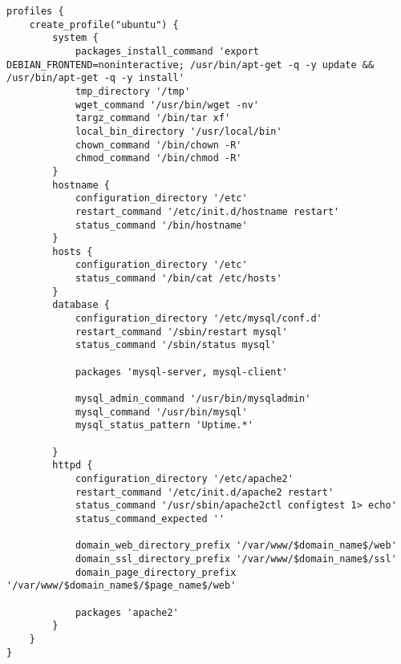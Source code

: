 \begin{lstlisting}[style=Java, caption=Beispiel Profil Ubuntu Server]
profiles {
	create_profile("ubuntu") {
		system {
			packages_install_command 'export DEBIAN_FRONTEND=noninteractive; /usr/bin/apt-get -q -y update && /usr/bin/apt-get -q -y install'
			tmp_directory '/tmp'
			wget_command '/usr/bin/wget -nv'
			targz_command '/bin/tar xf'
			local_bin_directory '/usr/local/bin'
			chown_command '/bin/chown -R'
			chmod_command '/bin/chmod -R'
		}
		hostname {
			configuration_directory '/etc'
			restart_command '/etc/init.d/hostname restart'
			status_command '/bin/hostname'
		}
		hosts {
			configuration_directory '/etc'
			status_command '/bin/cat /etc/hosts'
		}
		database {
			configuration_directory '/etc/mysql/conf.d'
			restart_command '/sbin/restart mysql'
			status_command '/sbin/status mysql'
			
			packages 'mysql-server, mysql-client'
			
			mysql_admin_command '/usr/bin/mysqladmin'
			mysql_command '/usr/bin/mysql'
			mysql_status_pattern 'Uptime.*'
			
		}
		httpd {
			configuration_directory '/etc/apache2'
			restart_command '/etc/init.d/apache2 restart'
			status_command '/usr/sbin/apache2ctl configtest 1> echo'
			status_command_expected ''
			
			domain_web_directory_prefix '/var/www/$domain_name$/web'
			domain_ssl_directory_prefix '/var/www/$domain_name$/ssl'
			domain_page_directory_prefix '/var/www/$domain_name$/$page_name$/web'
			
			packages 'apache2'
		}
	}
}
\end{lstlisting}

